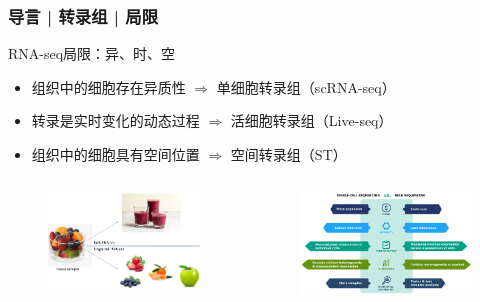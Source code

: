 \documentclass[11pt]{ctexbeamer}
\begin{document}
\begin{frame}
  \frametitle{导言 | 转录组 | 局限}
      \begin{block}{RNA-seq局限：异、时、空}
        \begin{itemize}
          \item \alert{组织中的细胞存在异质性} $\Longrightarrow$ 单细胞转录组（scRNA-seq）
          \item 转录是实时变化的动态过程 $\Longrightarrow$ 活细胞转录组（Live-seq）
          \item 组织中的细胞具有空间位置 $\Longrightarrow$ 空间转录组（ST）
        \end{itemize}
      \end{block}
  \begin{columns}
  \begin{figure}
    \centering
    \includegraphics[width=\textwidth]{bulk_vs_sc_05.png}
  \end{figure}
  \begin{figure}
    \centering
    \includegraphics[width=\textwidth]{bulk_vs_sc_01.png}
  \end{figure}
  \end{columns}
\end{frame}
\end{document}
